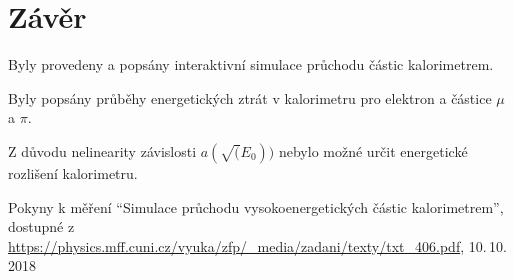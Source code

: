 \documentclass{protokol}
\begin{document}
  \section*{Závěr}

    Byly provedeny a popsány interaktivní simulace průchodu částic kalorimetrem.

    Byly popsány průběhy energetických ztrát v kalorimetru pro elektron a částice $\mu$ a $\pi$.

    Z důvodu nelinearity závislosti $a(\sqrt(E_0))$ nebylo možné určit energetické rozlišení kalorimetru.


  \begin{thebibliography}{}
 
    Pokyny k měření ``Simulace průchodu vysokoenergetických částic
    kalorimetrem'', dostupné z\\ \url{https://physics.mff.cuni.cz/vyuka/zfp/_media/zadani/texty/txt_406.pdf}, 10.\,10.\,2018
   
  \end{thebibliography}
\end{document}
